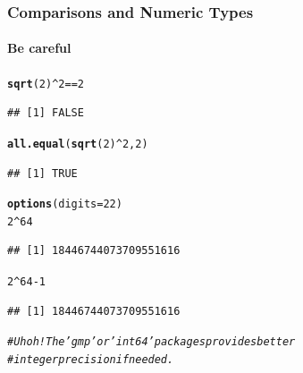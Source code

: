 \documentclass{beamer}\usepackage[]{graphicx}\usepackage[]{color}
\makeatletter
\newcommand{\hlnum}[1]{\textcolor[rgb]{0.686,0.059,0.569}{#1}}%
\newcommand{\hlcom}[1]{\textcolor[rgb]{0.678,0.584,0.686}{\textit{#1}}}%
\newcommand{\hlopt}[1]{\textcolor[rgb]{0,0,0}{#1}}%
\newcommand{\hlstd}[1]{\textcolor[rgb]{0.345,0.345,0.345}{#1}}%
\newcommand{\hlkwc}[1]{\textcolor[rgb]{0.333,0.667,0.333}{#1}}%
\newcommand{\hlkwd}[1]{\textcolor[rgb]{0.737,0.353,0.396}{\textbf{#1}}}%
\newenvironment{kframe}{%
 \def\at@end@of@kframe{}%
 \ifinner\ifhmode%
  \def\at@end@of@kframe{\end{minipage}}%
  \begin{minipage}{\columnwidth}%
 \fi\fi%
 \def\FrameCommand##1{\hskip\@totalleftmargin \hskip-\fboxsep
 \colorbox{shadecolor}{##1}\hskip-\fboxsep
     \hskip-\linewidth \hskip-\@totalleftmargin \hskip\columnwidth}%
 \MakeFramed {\advance\hsize-\width
   \@totalleftmargin\z@ \linewidth\hsize
   \@setminipage}}%
 {\par\unskip\endMakeFramed%
 \at@end@of@kframe}
\newenvironment{knitrout}{}{} %
\makeatother
\begin{document}
\begin{frame}[fragile]
    \frametitle{Comparisons and Numeric Types}
    \framesubtitle{Be careful}
\begin{knitrout}\footnotesize
{}\color{fgcolor}\begin{kframe}
\begin{alltt}
\hlkwd{sqrt}\hlstd{(}\hlnum{2}\hlstd{)}\hlopt{^}\hlnum{2} \hlopt{==} \hlnum{2}
\end{alltt}
\begin{verbatim}
## [1] FALSE
\end{verbatim}
\begin{alltt}
\hlkwd{all.equal}\hlstd{(}\hlkwd{sqrt}\hlstd{(}\hlnum{2}\hlstd{)}\hlopt{^}\hlnum{2}\hlstd{,} \hlnum{2}\hlstd{)}
\end{alltt}
\begin{verbatim}
## [1] TRUE
\end{verbatim}
\begin{alltt}
\hlkwd{options}\hlstd{(}\hlkwc{digits} \hlstd{=} \hlnum{22}\hlstd{)}
\hlnum{2}\hlopt{^}\hlnum{64}
\end{alltt}
\begin{verbatim}
## [1] 18446744073709551616
\end{verbatim}
\begin{alltt}
\hlnum{2}\hlopt{^}\hlnum{64} \hlopt{-} \hlnum{1}
\end{alltt}
\begin{verbatim}
## [1] 18446744073709551616
\end{verbatim}
\begin{alltt}
\hlcom{# Uh oh!  The 'gmp' or 'int64' packages provides better}
\hlcom{# integer precision if needed.}
\end{alltt}
\end{kframe}
\end{knitrout}



\end{frame}
\end{document}
